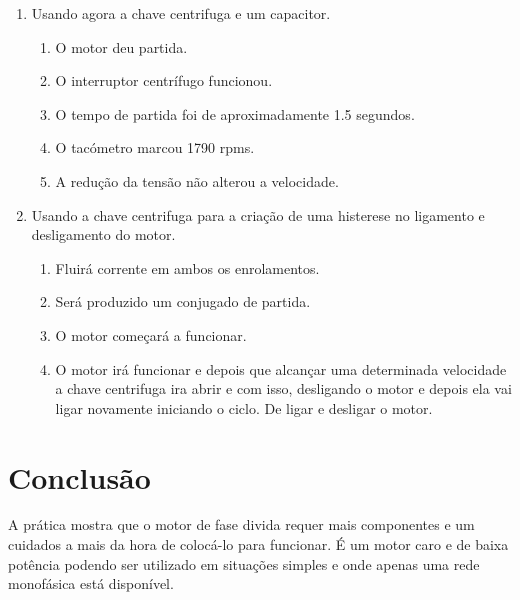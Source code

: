 \documentclass[paper=a4, fontsize=11pt]{article}
\begin{document}
\begin{enumerate}
\item Usando agora a chave centrifuga e um capacitor.

        \begin{enumerate}
            \item O motor deu partida.
            \item O interruptor centrífugo funcionou.
            \item O tempo de partida foi de aproximadamente 1.5 segundos.
            \item O tacómetro marcou 1790 rpms.
            \item A redução da tensão não alterou a velocidade.
            

        \end{enumerate}

\item Usando a chave centrifuga para a criação de uma histerese no ligamento
        e desligamento do motor.

        \begin{enumerate}
            \item Fluirá corrente em ambos os enrolamentos.
            \item Será produzido um conjugado de partida.
            \item O motor começará a funcionar.
            \item O motor irá funcionar e depois que alcançar uma determinada velocidade a chave centrifuga ira abrir e com isso, desligando o motor e depois ela vai ligar novamente iniciando o ciclo. De ligar e desligar o motor.
        \end{enumerate}

\end{enumerate}


\section{Conclusão}

A prática mostra que o motor de fase divida requer mais componentes 
e um cuidados a mais da hora de colocá-lo para funcionar. 
É um motor caro e de baixa potência podendo ser utilizado em 
situações simples e onde apenas uma rede monofásica está disponível.
\end{document}
